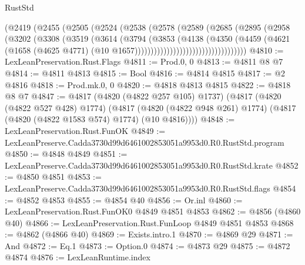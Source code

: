 \begin{lexlean}{RustStd}
\begin{coremodule}
                              (@2419
                                (@2455
                                  (@2505
                                    (@2524
                                      (@2538
                                        (@2578
                                          (@2589
                                            (@2685
                                              (@2895
                                                (@2958
                                                  (@3202
                                                    (@3308
                                                      (@3519
                                                        (@3614
                                                          (@3794
                                                            (@3853
                                                              (@4138
                                                                (@4350
                                                                  (@4459
                                                                    (@4621
                                                                      (@1658
                                                                        (@4625 @4771)
                                                                        (@10
                                                                          @1657)))))))))))))))))))))))))))))))))))
@4810 := LexLeanPreservation.Rust.Flags
@4811 := Prod.{0, 0}
@4813 := @4811 @8 @7
@4814 := @4811 @4813
@4815 := Bool
@4816 := @4814 @4815
@4817 := @2 @4816
@4818 := Prod.mk.{0, 0}
@4820 := @4818 @4813 @4815
@4822 := @4818 @8 @7
@4847 := @4817
    (@4820 (@4822 @257 @105) @1737)
    (@4817
      (@4820 (@4822 @527 @428) @1774)
      (@4817 (@4820 (@4822 @948 @261) @1774) (@4817 (@4820 (@4822 @1583 @574) @1774) (@10 @4816))))
@4848 := LexLeanPreservation.Rust.FunOK
@4849 := LexLeanPreserve.Cadda3730d99d6461002853051a9953d0.R0.RustStd.program
@4850 := @4848 @4849
@4851 := LexLeanPreserve.Cadda3730d99d6461002853051a9953d0.R0.RustStd.krate
@4852 := @4850 @4851
@4853 := LexLeanPreserve.Cadda3730d99d6461002853051a9953d0.R0.RustStd.flags
@4854 := @4852 @4853
@4855 := @4854 @40
@4856 := Or.inl
@4860 := LexLeanPreservation.Rust.FunOK0 @4849 @4851 @4853
@4862 := @4856 (@4860 @40)
@4866 := LexLeanPreservation.Rust.FunLoop @4849 @4851 @4853
@4868 := @4862 (@4866 @40)
@4869 := Exists.intro.{1}
@4870 := @4869 @29
@4871 := And
@4872 := Eq.{1}
@4873 := Option.{0}
@4874 := @4873 @29
@4875 := @4872 @4874
@4876 := LexLeanRuntime.index

\end{coremodule}
\end{lexlean}
